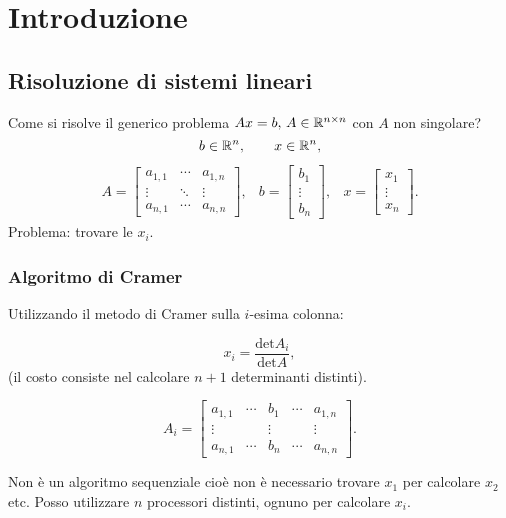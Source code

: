 \chapter{Introduzione}
\section{Risoluzione di sistemi lineari}

Come si risolve il generico problema $Ax = b, \,   A \in \mathbb{R}^{n \times n}$ con
$A$ non singolare?
\[
b \in \mathbb{R}^n, \qquad
x \in \mathbb{R}^n,
\]
\[
\begin{array}{ccc}
A = \left [\begin{array}{ccc}
a_{1,1} & \cdots & a_{1,n} \\
\vdots & \ddots & \vdots \\
a_{n,1} & \cdots & a_{n,n}
\end{array}
\right],
&
b = \left[ \begin{array}{c}
b_{1} \\
\vdots \\
b_{n}
\end{array}\right],
&
x = \left [\begin{array}{c}
x_{1} \\
\vdots \\
x_{n}
\end{array}\right].
\end{array}
\]
Problema: trovare le $x_i$.
\subsection{Algoritmo di Cramer}
Utilizzando il metodo di Cramer sulla $i$-esima colonna:

\[x_i = \frac{\textrm{det}A_i}{\textrm{det}A},\]
(il costo consiste nel calcolare $n+1$ determinanti
distinti).

\[
A_i = \left[ \begin{array}{ccccc}
a_{1,1} & \cdots & b_1 & \cdots & a_{1,n} \\
\vdots & & \vdots & & \vdots \\
a_{n,1} & \cdots & b_n & \cdots & a_{n,n}
\end{array} \right].
\]

Non è un algoritmo sequenziale cioè non è necessario trovare $x_1$ per
calcolare $x_2$ etc.
Posso utilizzare $n$ processori distinti, ognuno per calcolare $x_i$.


